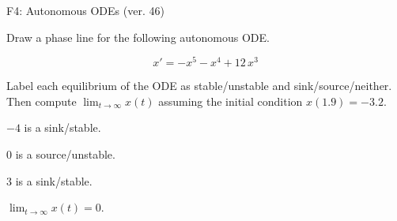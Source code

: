 \begin{exercise}
  \begin{exerciseTitle}F4: Autonomous ODEs (ver. 46)\end{exerciseTitle}
  \begin{exerciseStatement}
    

      Draw a phase line for the following 
      autonomous ODE.
    

    
\[x'= -x^{5} - x^{4} + 12 \, x^{3}\]

    

      Label each equilibrium of the ODE
      as stable/unstable and sink/source/neither.
      Then compute \(\lim_{t\to\infty}x(t)\)
      assuming the initial condition
      \(x( 1.9 )= -3.2\).
    

  \end{exerciseStatement}
  \begin{exerciseAnswer}
    

      \(-4\) is a sink/stable.
      
        \(0\) is a source/unstable.
      
      \(3\) is a sink/stable.
    

    

      \(\lim_{t\to\infty}x(t)=0\).
    

  \end{exerciseAnswer}
\end{exercise}